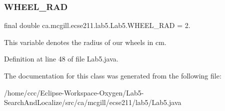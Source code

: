 \mbox{\label{classca_1_1mcgill_1_1ecse211_1_1lab5_1_1_lab5_ab9b6fc96d3fb1ac6c7d69d1727b3bbdd}} 
\subsubsection{\texorpdfstring{W\+H\+E\+E\+L\+\_\+\+R\+AD}{WHEEL\_RAD}}
{\footnotesize\ttfamily final double ca.\+mcgill.\+ecse211.\+lab5.\+Lab5.\+W\+H\+E\+E\+L\+\_\+\+R\+AD = 2.\hspace{0.3cm}{\ttfamily [static]}}

This variable denotes the radius of our wheels in cm. 

Definition at line 48 of file Lab5.\+java.



The documentation for this class was generated from the following file\+:\begin{DoxyCompactItemize}
\item 
/home/ccc/\+Eclipse-\/\+Workspace-\/\+Oxygen/\+Lab5-\/\+Search\+And\+Localize/src/ca/mcgill/ecse211/lab5/Lab5.\+java\end{DoxyCompactItemize}
